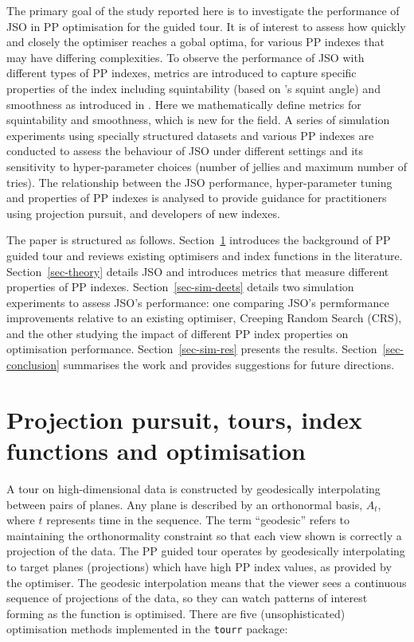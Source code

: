 \documentclass[
  number,
  preprint,
  3p]{elsarticle}
\begin{document}
The primary goal of the study reported here is to investigate the
performance of JSO in PP optimisation for the guided tour. It is of
interest to assess how quickly and closely the optimiser reaches a gobal
optima, for various PP indexes that may have differing complexities. To
observe the performance of JSO with different types of PP indexes,
metrics are introduced to capture specific properties of the index
including squintability (based on \citet{barnett1981interpreting}'s
squint angle) and smoothness as introduced in \citet{laa_using_2020}.
Here we mathematically define metrics for squintability and smoothness,
which is new for the field. A series of simulation experiments using
specially structured datasets and various PP indexes are conducted to
assess the behaviour of JSO under different settings and its sensitivity
to hyper-parameter choices (number of jellies and maximum number of
tries). The relationship between the JSO performance, hyper-parameter
tuning and properties of PP indexes is analysed to provide guidance for
practitioners using projection pursuit, and developers of new indexes.

The paper is structured as follows. Section~\ref{sec-background}
introduces the background of PP guided tour and reviews existing
optimisers and index functions in the literature.
Section~\ref{sec-theory} details JSO and introduces metrics that measure
different properties of PP indexes. Section~\ref{sec-sim-deets} details
two simulation experiments to assess JSO's performance: one comparing
JSO's permformance improvements relative to an existing optimiser,
Creeping Random Search (CRS), and the other studying the impact of
different PP index properties on optimisation performance.
Section~\ref{sec-sim-res} presents the results.
Section~\ref{sec-conclusion} summarises the work and provides
suggestions for future directions.

\section{Projection pursuit, tours, index functions and
optimisation}\label{sec-background}

A tour on high-dimensional data is constructed by geodesically
interpolating between pairs of planes. Any plane is described by an
orthonormal basis, \(A_t\), where \(t\) represents time in the sequence.
The term ``geodesic'' refers to maintaining the orthonormality
constraint so that each view shown is correctly a projection of the
data. The PP guided tour operates by geodesically interpolating to
target planes (projections) which have high PP index values, as provided
by the optimiser. The geodesic interpolation means that the viewer sees
a continuous sequence of projections of the data, so they can watch
patterns of interest forming as the function is optimised. There are
five (unsophisticated) optimisation methods implemented in the
\texttt{tourr} package:
\end{document}
